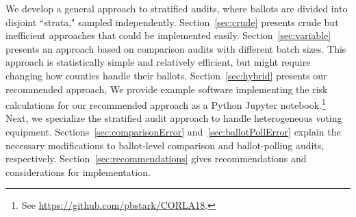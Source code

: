 \documentclass[runningheads]{llncs}
\begin{document}
We develop a general approach to stratified audits, where ballots are divided into disjoint ``strata,"
sampled independently.
Section~\ref{sec:crude} presents crude but inefficient approaches
that could be implemented easily.
Section~\ref{sec:variable}
presents an approach based on comparison audits with different batch sizes.
This approach is statistically simple and relatively efficient, but might require changing how counties
handle their ballots.
Section~\ref{sec:hybrid} presents our recommended approach, 
We provide example software implementing the risk calculations for
our recommended approach as a Python Jupyter notebook.\footnote{%
 See \url{https://github.com/pbstark/CORLA18}.
}
Next, we specialize the stratified audit approach to handle heterogeneous voting equipment.
Sections~\ref{sec:comparisonError} and~\ref{sec:ballotPollError} explain
the necessary modifications to ballot-level comparison and ballot-polling audits, respectively. 
Section~\ref{sec:recommendations} gives recommendations and
considerations for implementation.
\end{document}
